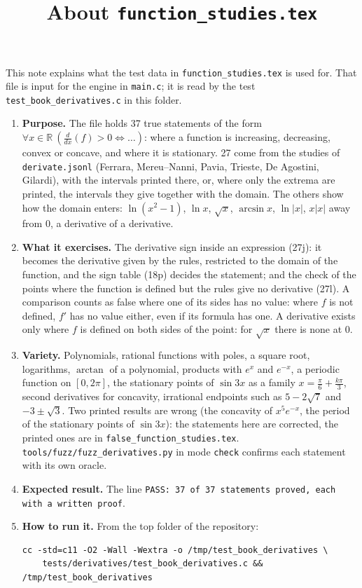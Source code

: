 \documentclass[11pt,a4paper]{article}
\title{About \texttt{function\_studies.tex}}
\author{}
\date{}
\begin{document}
\maketitle
This note explains what the test data in \texttt{function\_studies.tex} is used for. That file is input for the engine in \texttt{main.c}; it is read by the test \texttt{test\_book\_derivatives.c} in this folder.

\begin{enumerate}
\item \textbf{Purpose.} The file holds 37 true statements of the form $\forall x \in \mathbb{R}\ \left(\frac{d}{dx}\left( f \right) > 0 \iff \ldots\right)$: where a function is increasing, decreasing, convex or concave, and where it is stationary. 27 come from the studies of \texttt{derivate.jsonl} (Ferrara, Mereu--Nanni, Pavia, Trieste, De Agostini, Gilardi), with the intervals printed there, or, where only the extrema are printed, the intervals they give together with the domain. The others show how the domain enters: $\ln(x^{2} - 1)$, $\ln x$, $\sqrt{x}$, $\arcsin x$, $\ln|x|$, $x|x|$ away from $0$, a derivative of a derivative.

\item \textbf{What it exercises.} The derivative sign inside an expression (27j): it becomes the derivative given by the rules, restricted to the domain of the function, and the sign table (18p) decides the statement; and the check of the points where the function is defined but the rules give no derivative (27l). A comparison counts as false where one of its sides has no value: where $f$ is not defined, $f'$ has no value either, even if its formula has one. A derivative exists only where $f$ is defined on both sides of the point: for $\sqrt{x}$ there is none at $0$.

\item \textbf{Variety.} Polynomials, rational functions with poles, a square root, logarithms, $\arctan$ of a polynomial, products with $e^{x}$ and $e^{-x}$, a periodic function on $[0, 2\pi]$, the stationary points of $\sin 3x$ as a family $x = \frac{\pi}{6} + \frac{k\pi}{3}$, second derivatives for concavity, irrational endpoints such as $5 - 2\sqrt{7}$ and $-3 \pm \sqrt{3}$. Two printed results are wrong (the concavity of $x^{5} e^{-x}$, the period of the stationary points of $\sin 3x$): the statements here are corrected, the printed ones are in \texttt{false\_function\_studies.tex}. \texttt{tools/fuzz/fuzz\_derivatives.py} in mode \texttt{check} confirms each statement with its own oracle.

\item \textbf{Expected result.} The line \texttt{PASS: 37 of 37 statements proved, each with a written proof}.

\item \textbf{How to run it.} From the top folder of the repository:
\begin{verbatim}
cc -std=c11 -O2 -Wall -Wextra -o /tmp/test_book_derivatives \
    tests/derivatives/test_book_derivatives.c && /tmp/test_book_derivatives
\end{verbatim}
\end{enumerate}
\end{document}
